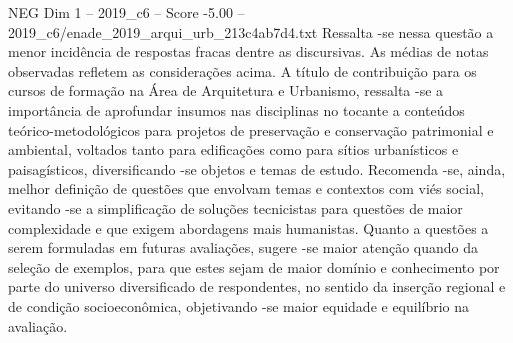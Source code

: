 \begin{textsample}{NEG Dim 1 – 2019\_c6 – Score -5.00 – 2019\_c6/enade\_2019\_arqui\_urb\_213c4ab7d4.txt}
Ressalta -se nessa questão a menor incidência de respostas fracas dentre as discursivas.
As médias de notas observadas refletem as considerações acima.
A título de contribuição para os cursos de formação na Área de Arquitetura e Urbanismo, ressalta -se a importância de aprofundar insumos nas disciplinas no tocante a conteúdos teórico-metodológicos para projetos de preservação e conservação patrimonial e ambiental, voltados tanto para edificações como para sítios urbanísticos e paisagísticos, diversificando -se objetos e temas de estudo.
Recomenda -se, ainda, melhor definição de questões que envolvam temas e contextos com viés social, evitando -se a simplificação de soluções tecnicistas para questões de maior complexidade e que exigem abordagens mais humanistas.
Quanto a questões a serem formuladas em futuras avaliações, sugere -se maior atenção quando da seleção de exemplos, para que estes sejam de maior domínio e conhecimento por parte do universo diversificado de respondentes, no sentido da inserção regional e de condição socioeconômica, objetivando -se maior equidade e equilíbrio na avaliação.

\end{textsample}
